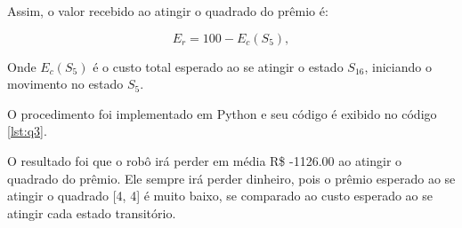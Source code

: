 \begin{tcolorbox}[title=Resposta:]
Assim, o valor recebido ao atingir o quadrado do prêmio é:

\begin{equation}
    E_r = 100 - E_c(S_5),
\end{equation}

Onde $E_c(S_5)$ é o custo total esperado ao se atingir o estado $S_{16}$, iniciando o movimento no estado $S_5$.

O procedimento foi implementado em Python e seu código é exibido no código \ref{lst:q3}.

O resultado foi que o robô irá perder em média R\$ -1126.00 ao atingir o quadrado do prêmio. Ele sempre irá perder dinheiro, pois o prêmio esperado ao se atingir o quadrado [4, 4] é muito baixo, se comparado ao custo esperado ao se atingir cada estado transitório.

\end{tcolorbox}

